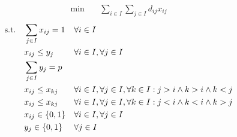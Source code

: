 \begin{align}
    \min\quad       & \sum_{i \in I} \sum_{j \in I} d_{ij} x_{ij}
    \label{eq:pmedian-obj}
\end{align}
\vspace*{-6mm}
\begin{align}
    \text{s.t.\quad}
    \label{eq:pmedian-c1}
    & \sum_{j \in I} x_{ij} = 1 & & \forall i \in I                                                                    \\
    \label{eq:pmedian-c2}
    & x_{ij} \leq y_j           & & \forall i \in I, \forall j \in I                                                   \\
    \label{eq:pmedian-c3}
    & \sum_{j \in I} y_j = p    & &                                                                                    \\
    \label{eq:pmedian-c4}
    & x_{ij} \leq x_{kj}        & & \forall i \in I, \forall j \in I, \forall k \in I: j > i \wedge k > i \wedge k < j \\
    \label{eq:pmedian-c5}
    & x_{ij} \leq x_{kj}        & & \forall i \in I, \forall j \in I, \forall k \in I: j < i \wedge k < i \wedge k > j \\
    \label{eq:pmedian-c6}
    & x_{ij} \in \{0,1\}        & & \forall i \in I, \forall j \in I                                                   \\
    \label{eq:pmedian-c7}
    & y_j \in \{0,1\}           & & \forall j \in I
\end{align}
